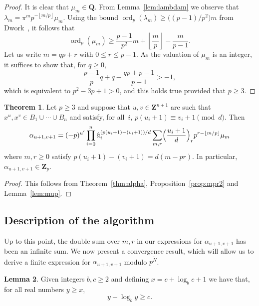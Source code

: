 \documentclass[a4paper,11pt]{article}
\numberwithin{equation}{section}
\providecommand{\floor}[1]{\left\lfloor#1\right\rfloor}   %
\newcommand{\ZZ}{\mathbf{Z}} %
\newcommand{\QQ}{\mathbf{Q}} %
\DeclareMathOperator{\ord}{ord}          %
\theoremstyle{definition}
\newtheorem{thm}{Theorem}[section]
\newtheorem{lem}[thm]{Lemma}
\begin{document}
\begin{proof}
It is clear that $\mu_m \in \QQ$.  From Lemma~\ref{lem:lambdam} 
we observe that $\lambda_m = \pi^m p^{- \floor{m/p}} \mu_m$.  Using the 
bound $\ord_p(\lambda_m) \geq \bigl((p-1)/p^2\bigr) m$ 
from Dwork~\citep[pp.~55--57]{Dwork1962}, it follows that 
\begin{equation}
\ord_p (\mu_m) \geq \frac{p-1}{p^2} m + \floor{\frac{m}{p}} - \frac{m}{p-1}.
\end{equation}
Let us write $m = q p + r$ with $0 \leq r \leq p-1$.  As the valuation 
of $\mu_m$ is an integer, it suffices to show that, for $q \geq 0$, 
\begin{equation}
\frac{p-1}{p} q + q - \frac{q p + p - 1}{p - 1} > -1,
\end{equation}
which is equivalent to $p^2 - 3p + 1 > 0$, and this holds true 
provided that $p \geq 3$.
\end{proof}

\begin{thm} \label{thm:alphap}
Let $p \geq 3$ and suppose that $u, v \in \ZZ^{n+1}$ are such 
that $x^u, x^v \in B_1 \cup \dotsb \cup B_n$ and satisfy, for all~$i$, 
$p (u_i + 1) \equiv v_i + 1 \pmod{d}$. Then 
\begin{equation} \label{eq:alphap.0}
\alpha_{u+1,v+1} = (-p)^{u'} \prod_{i=0}^n 
    \hat{a}_i^{(p (u_i + 1) - (v_i + 1))/d} \sum_{m,r} 
    \Bigl(\frac{u_i+1}{d}\Bigr)_r p^{r - \floor{m/p}} \mu_m
\end{equation}
where $m, r \geq 0$ satisfy $p (u_i + 1) - (v_i + 1) = d (m - pr)$. 
In particular, $\alpha_{u+1, v+1} \in \ZZ_p$. 
\end{thm}

\begin{proof}
This follows from Theorem~\ref{thm:alpha}, Proposition~\ref{prop:mpr2} 
and Lemma~\ref{lem:mup}.
\end{proof}

\subsection{Description of the algorithm}

Up to this point, the double sum over $m,r$ in our expressions 
for $\alpha_{u+1,v+1}$ has been an infinite sum.  We now present 
a convergence result, which will allow us to derive a finite 
expression for $\alpha_{u+1,v+1}$ modulo $p^{\tilde{N}}$.

\begin{lem} \label{lem:log}
Given integers $b,c \geq 2$ and defining $x = c + \log_b c + 1$ 
we have that, for all real numbers $y \geq x$, 
\begin{equation}
y - \log_b y \geq c.
\end{equation}
\end{lem}
\end{document}
